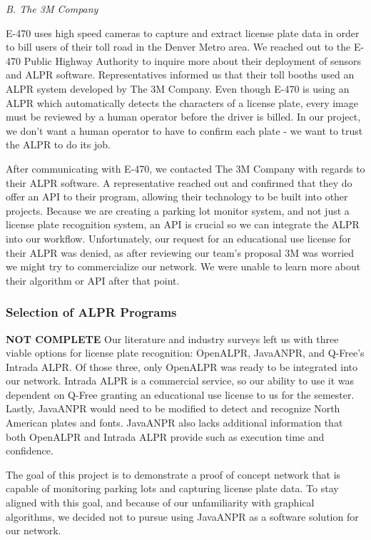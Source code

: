 \documentclass[11pt, oneside, fullpage, doublespace]{article}
\begin{document}
\emph{B. The 3M Company}

E-470 uses high speed cameras to capture and extract license plate data in order to bill users of their toll road in the Denver Metro area. We reached out to the E-470 Public Highway Authority to inquire more about their deployment of sensors and ALPR software. Representatives informed us that their toll booths used an ALPR system developed by The 3M Company. Even though E-470 is using an ALPR which automatically detects the characters of a license plate, every image must be reviewed by a human operator before the driver is billed. In our project, we don't want a human operator to have to confirm each plate - we want to trust the ALPR to do its job.

After communicating with E-470, we contacted The 3M Company with regards to their ALPR software. A representative reached out and confirmed that they do offer an API to their program, allowing their technology to be built into other projects. Because we are creating a parking lot monitor system, and not just a license plate recognition system, an API is crucial so we can integrate the ALPR into our workflow. Unfortunately, our request for an educational use license for their ALPR was denied, as after reviewing our team's proposal 3M was worried we might try to commercialize our network. We were unable to learn more about their algorithm or API after that point.

\subsubsection{Selection of ALPR Programs}
{\color{red}\textbf{NOT COMPLETE}}
Our literature and industry surveys left us with three viable options for license plate recognition: OpenALPR, JavaANPR, and Q-Free's Intrada ALPR. Of those three, only OpenALPR was ready to be integrated into our network. Intrada ALPR is a commercial service, so our ability to use it was dependent on Q-Free granting an educational use license to us for the semester. Lastly, JavaANPR would need to be modified to detect and recognize North American plates and fonts. JavaANPR also lacks additional information that both OpenALPR and Intrada ALPR provide such as execution time and confidence.

The goal of this project is to demonstrate a proof of concept network that is capable of monitoring parking lots and capturing license plate data. To stay aligned with this goal, and because of our unfamiliarity with graphical algorithms, we decided not to pursue using JavaANPR as a software solution for our network.
\end{document}
